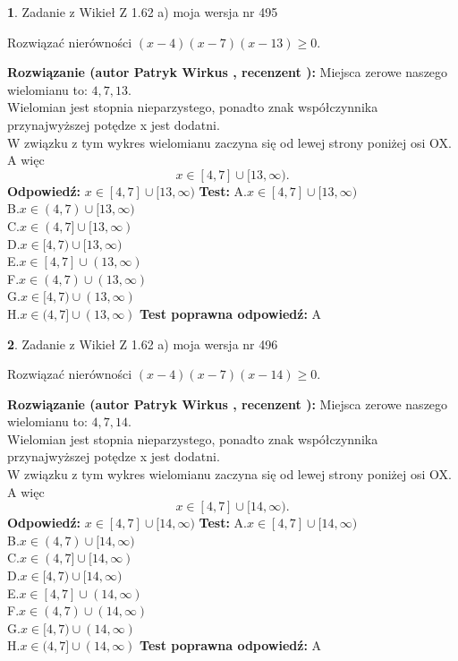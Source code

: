 \documentclass[12pt, a4paper]{article}
\theoremstyle{definition} %
\newtheorem{zad}{}
\newcommand{\zadStart}[1]{\begin{zad}#1\newline}
\newcommand{\zadStop}{\end{zad}}
\newcommand{\rozwStart}[2]{\noindent \textbf{Rozwiązanie (autor #1 , recenzent #2): }\newline}
\newcommand{\rozwStop}{\newline}
\newcommand{\odpStart}{\noindent \textbf{Odpowiedź:}\newline}
\newcommand{\odpStop}{\newline}
\newcommand{\testStart}{\noindent \textbf{Test:}\newline}
\newcommand{\testStop}{\newline}
\newcommand{\kluczStart}{\noindent \textbf{Test poprawna odpowiedź:}\newline}
\newcommand{\kluczStop}{\newline}
\begin{document}
\zadStart{Zadanie z Wikieł Z 1.62 a) moja wersja nr 495}

Rozwiązać nierówności $(x-4)(x-7)(x-13)\ge0$.
\zadStop
\rozwStart{Patryk Wirkus}{}
Miejsca zerowe naszego wielomianu to: $4, 7, 13$.\\
Wielomian jest stopnia nieparzystego, ponadto znak współczynnika przy\linebreak najwyższej potędze x jest dodatni.\\ W związku z tym wykres wielomianu zaczyna się od lewej strony poniżej osi OX. A więc $$x \in [4,7] \cup [13,\infty).$$
\rozwStop
\odpStart
$x \in [4,7] \cup [13,\infty)$
\odpStop
\testStart
A.$x \in [4,7] \cup [13,\infty)$\\
B.$x \in (4,7) \cup [13,\infty)$\\
C.$x \in (4,7] \cup [13,\infty)$\\
D.$x \in [4,7) \cup [13,\infty)$\\
E.$x \in [4,7] \cup (13,\infty)$\\
F.$x \in (4,7) \cup (13,\infty)$\\
G.$x \in [4,7) \cup (13,\infty)$\\
H.$x \in (4,7] \cup (13,\infty)$
\testStop
\kluczStart
A
\kluczStop



\zadStart{Zadanie z Wikieł Z 1.62 a) moja wersja nr 496}

Rozwiązać nierówności $(x-4)(x-7)(x-14)\ge0$.
\zadStop
\rozwStart{Patryk Wirkus}{}
Miejsca zerowe naszego wielomianu to: $4, 7, 14$.\\
Wielomian jest stopnia nieparzystego, ponadto znak współczynnika przy\linebreak najwyższej potędze x jest dodatni.\\ W związku z tym wykres wielomianu zaczyna się od lewej strony poniżej osi OX. A więc $$x \in [4,7] \cup [14,\infty).$$
\rozwStop
\odpStart
$x \in [4,7] \cup [14,\infty)$
\odpStop
\testStart
A.$x \in [4,7] \cup [14,\infty)$\\
B.$x \in (4,7) \cup [14,\infty)$\\
C.$x \in (4,7] \cup [14,\infty)$\\
D.$x \in [4,7) \cup [14,\infty)$\\
E.$x \in [4,7] \cup (14,\infty)$\\
F.$x \in (4,7) \cup (14,\infty)$\\
G.$x \in [4,7) \cup (14,\infty)$\\
H.$x \in (4,7] \cup (14,\infty)$
\testStop
\kluczStart
A
\kluczStop
\end{document}
